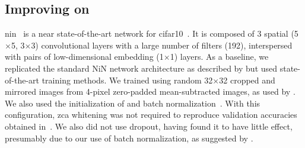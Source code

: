 \documentclass[thesis]{subfiles}
\begin{document}
	\subsection{Improving  on }
	\Gls{nin}~\citep{Lin2013NiN} is a near state-of-the-art network for \gls{cifar10}~\citep{CIFAR10}. It is composed of 3 spatial (5$\times$5, 3$\times$3) convolutional layers with a large number of filters (192), interspersed with pairs of low-dimensional embedding (1$\times$1) layers. As a baseline, we replicated the standard NiN network architecture as described by \citet{Lin2013NiN} but used state-of-the-art training methods. We trained using random 32$\times$32 cropped and mirrored images from 4-pixel zero-padded  mean-subtracted images, as used by \citet{goodfellow2013maxout, He2015}. We also used the initialization of \citet{He2015b} and batch normalization~\citep{Ioffe2015}. With this configuration, \gls{zca} whitening was not required to reproduce validation accuracies obtained in~\citep{Lin2013NiN}. We also did not use dropout, having found it to have little effect, presumably due to our use of batch normalization, as suggested by \citet{Ioffe2015}.
	
\end{document}
